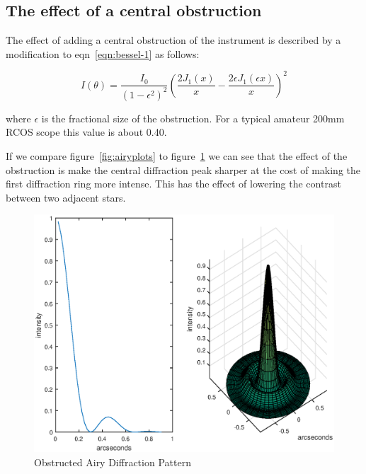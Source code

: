 \documentclass[11pt]{article}
\begin{document}
\subsection{The effect of a central obstruction}

The effect of adding a central obstruction of the instrument is described by a modification to eqn~\ref{eqn:bessel-1} as follows:

\begin{equation}
I(\theta) =  \frac{I_{0}}{\left( 1-\epsilon^2 \right) ^2}     
\left(
\frac{2J_{1}(x)}{x} - \frac{2\epsilon J_{1}(\epsilon x)}{x}
\right)^{2}
\end{equation}

where $\epsilon$ is the fractional size of the obstruction.  For a typical amateur 200mm RCOS scope this value is about 0.40.  

If we compare figure~\ref{fig:airyplots} to figure~\ref{fig:obstructed-airy} we can see that the effect of the obstruction is make the central diffraction peak sharper at the cost of making the first diffraction ring more intense.  This has the effect of lowering the contrast between two adjacent stars.  

\begin{figure}[htb]
	\begin{center}
		\includegraphics[scale=0.7]{./images/obstructed-airy.eps}
		\caption{Obstructed Airy Diffraction Pattern}
		\label{fig:obstructed-airy}
	\end{center}
\end{figure}
\end{document}
